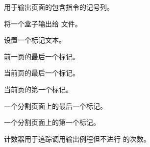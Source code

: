 \documentclass{book}
\begin{document}
\label{cschap:output}\label{cschap:shipout}\label{cschap:mark}\label{cschap:topmark}\label{cschap:botmark}\label{cschap:firstmark}\label{cschap:splitbotmark}\label{cschap:splitfirstmark}\label{cschap:deadcycles}\label{cschap:maxdeadcycles}\label{cschap:outputpenalty2}
\begin{inventory}
\item [\cs{output}]
      用于输出页面的包含指令的记号列。

\item [\cs{shipout}]
      将一个盒子输出给  文件。


\item [\cs{mark}]
      设置一个标记文本。


\item [\cs{topmark}]
      前一页的最后一个标记。

\item [\cs{botmark}]
      当前页的最后一个标记。

\item [\cs{firstmark}]
      当前页的第一个标记。

\item [\cs{splitbotmark}]
      一个分割页面上的最后一个标记。

\item [\cs{splitfirstmark}]
      一个分割页面上的第一个标记。

\item [\cs{deadcycles}]
      计数器用于追踪调用输出例程但不进行  的次数。



\end{inventory}
\end{document}
